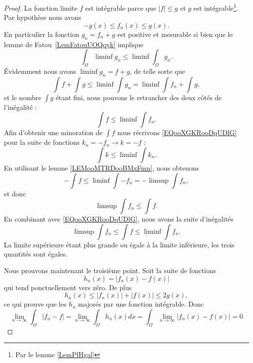 \begin{proof}

	La fonction limite \( f\) est intégrable parce que \( | f |\leq g\) et \( g\) est intégrable\footnote{Par le lemme \ref{LemPfHgal}}. Par hypothèse nous avons
	\begin{equation}
		-g(x)\leq f_n(x)\leq g(x).
	\end{equation}
	En particulier la fonction \( g_n=f_n+g\) est positive et mesurable si bien que le lemme de Fatou~\ref{LemFatouUOQqyk} implique
	\begin{equation}
		\int_{\Omega}\liminf g_n\leq\liminf\int_{\Omega}g_n.
	\end{equation}
	Évidemment nous avons \( \liminf g_n=f+g\), de telle sorte que
	\begin{equation}
		\int f+\int g\leq \liminf\int g_n=\liminf\int f_n+\int g,
	\end{equation}
	et le nombre \( \int g\) étant fini, nous pouvons le retrancher des deux côtés de l'inégalité :
    \begin{equation}        \label{EQooXGKRooDqUDlG}
		\int f\leq\liminf\int f_n.
	\end{equation}
    Afin d'obtenir une minoration de \( \int f\) nous récrivons \eqref{EQooXGKRooDqUDlG} pour la suite de fonctions \( k_n=-f_n\to k=-f\) :
    \begin{equation}
        \int k\leq \liminf\int k_n.
    \end{equation}
    En utilisant le lemme \ref{LEMooMTRDooBMxFmn}, nous obtenons
    \begin{equation}
    -\int f\leq \liminf\int-f_n=-\limsup\int f_n,
    \end{equation}
    et donc
    \begin{equation}
        \limsup\int f_n\leq \int f.
    \end{equation}
    En combinant avec \eqref{EQooXGKRooDqUDlG}, nous avons la suite d'inégalités
    \begin{equation}
        \limsup\int f_n\leq \int f\leq\liminf\int f_n.
    \end{equation}
	La limite supérieure étant plus grande ou égale à la limite inférieure, les trois quantités sont égales.

	Nous prouvons maintenant le troisième point. Soit la suite de fonctions
	\begin{equation}
		h_n(x)=| f_n(x)-f(x) |
	\end{equation}
	qui tend ponctuellement vers zéro. De plus
	\begin{equation}
		h_n(x)\leq | f_n(x) |+| f(x) |\leq 2g(x),
	\end{equation}
	ce qui prouve que les \( h_n\) majorés par une fonction intégrable. Donc
	\begin{equation}
		\lim_{n\to \infty} \int_{\Omega}| f_n-f |= \lim_{n\to \infty} \int_{\Omega}h_n(x)dx=\int_{\Omega}\lim_{n\to \infty} | f_n(x)-f(x) |=0
	\end{equation}
\end{proof}

